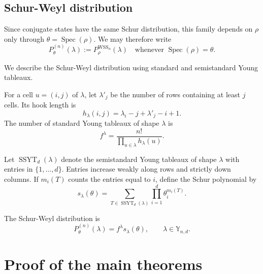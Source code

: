 \documentclass{article}
\theoremstyle{named}
\theoremstyle{named1}
\newcommand{\WSS}{\mathrm{WSS}}
\newcommand{\Young}{\mathbb Y_{n,d}}
\newcommand{\spec}{\operatorname{Spec}}
\theoremstyle{plain}
\theoremstyle{remark}
\begin{document}
\subsection{Schur-Weyl distribution}
Since conjugate states have the same Schur distribution, this family depends on $\rho$
only through $\theta=\spec(\rho)$.  We may therefore write
\[
    P_\theta^{(n)}(\lambda)
    :=P_\rho^{\WSS_n}(\lambda)
    \quad\text{whenever }\spec(\rho)=\theta.
\]

We describe the Schur-Weyl distribution using standard and semistandard
Young tableaux.


For a cell \(u=(i,j)\) of \(\lambda\), let \(\lambda'_j\) be the
number of rows containing at least \(j\) cells. Its hook length is
\[
h_\lambda(i,j)=\lambda_i-j+\lambda'_j-i+1.
\]
The number of standard Young tableaux of shape \(\lambda\) is
\[
f^\lambda
=
\frac{n!}{\displaystyle\prod_{u\in\lambda}h_\lambda(u)}.
\]

Let \(\operatorname{SSYT}_d(\lambda)\) denote the semistandard Young
tableaux of shape \(\lambda\) with entries in \(\{1,\ldots,d\}\).
Entries increase weakly along rows and strictly down columns. If
\(m_i(T)\) counts the entries equal to \(i\), define the Schur polynomial by
\[
s_\lambda(\theta)
=
\sum_{T\in\operatorname{SSYT}_d(\lambda)}
\prod_{i=1}^{d}\theta_i^{m_i(T)}.
\]

The Schur-Weyl distribution is
\[ P_\theta^{(n)}(\lambda)
=
f^\lambda s_\lambda(\theta),
\qquad \lambda\in\Young.
\]




\section{Proof of the main theorems}
\end{document}
